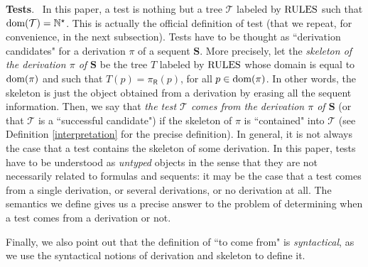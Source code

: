 \documentclass[copyright,creativecommons]{eptcs}
\newcommand{\NN}{\mathbb{N}}
\newcommand{\cT}{\mathcal{T}}
\newcommand{\bS}{\mathbf{S}}
\newcommand{\dom}{\ensuremath{\textnormal{dom}}}
\newcommand{\rules}{\textnormal{RULES}}
\newcommand{\sR}{\mathsf{R}}
\theoremstyle{definition}
\begin{document}
\vspace{-3.5mm}

\noindent \textbf{Tests}. \  In this paper,  a test is nothing but
 a tree $\cT$ labeled by $\rules$ such that
$\dom(\cT) = \NN^\star$. This is actually the official definition of test  (that we repeat, for convenience, in the next subsection). Tests have to be thought as ``derivation candidates" for a derivation $\pi$  of a sequent
$\bS$. More precisely,  let the \emph{skeleton of the derivation $\pi$ of $\bS$} be
the tree $T$ labeled by $\rules$ whose domain is equal to $\dom(\pi)$ and such that $T(p) = \pi_\sR(p)$, for all $p \in \dom(\pi)$.  In other words,
the skeleton is just the object obtained
from a derivation  by erasing all the sequent information.
Then,
we say that \emph{the test $\cT$ comes from the derivation $\pi$ of $\bS$}
(or that $\cT$ is a ``successful candidate")
if   the skeleton of $\pi$ is ``contained"
into $\cT$ (see Definition \ref{interpretation} for the precise definition).
In general,  it is not  always the case that a test
contains the skeleton of some derivation.
In this paper, tests have to be understood as  \emph{untyped} objects in the sense that they are not necessarily related to formulas and sequents:
it may be the case that a test comes from a single derivation, or several derivations, or no derivation at all. The semantics we  define gives us a precise answer to the problem of determining when a test comes from a derivation or not.

 Finally, we also point out that the definition of ``to come from"
is \emph{syntactical}, as we use
the syntactical notions of derivation and skeleton  to define it.\\



\vspace{-3.5mm}
\end{document}
